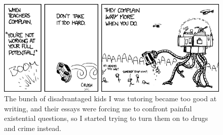 \documentclass[letterpaper,12pt]{article}
\begin{document}
\begin{figure}[ht!]
	\centering
	\includegraphics[width=6in]{potential.png}
    \caption*{The bunch of disadvantaged kids I was tutoring became too good at writing, and their essays were forcing me to confront painful existential questions, so I started trying to turn them on to drugs and crime instead.}
\end{figure}
\end{document}
